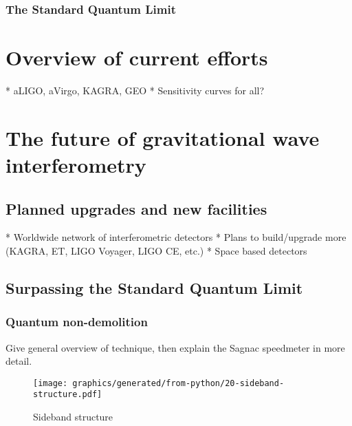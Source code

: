 \subsubsection{The Standard Quantum Limit}

\section{Overview of current efforts}
* aLIGO, aVirgo, KAGRA, GEO
* Sensitivity curves for all?

\section{The future of gravitational wave interferometry}

\subsection{Planned upgrades and new facilities}
* Worldwide network of interferometric detectors
* Plans to build/upgrade more (KAGRA, ET, LIGO Voyager, LIGO CE, etc.)
* Space based detectors

\subsection{Surpassing the Standard Quantum Limit}
\subsubsection{Quantum non-demolition}
Give general overview of technique, then explain the Sagnac speedmeter in more detail.

\begin{figure}
  \centering
  \texttt{[image: graphics/generated/from-python/20-sideband-structure.pdf]}
  \caption{Sideband structure}
  \label{fig:sideband-structure}
\end{figure}